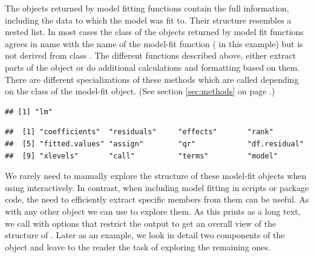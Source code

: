 \documentclass[krantz2]{krantz}\usepackage{knitr}
\begin{document}
\begin{explainbox}\label{box:LM:fit:object}
The objects returned by model fitting functions contain the full information, including the data to which the model was fit to. Their structure resembles a nested list. In most cases the class of the objects returned by model fit functions agrees in name with the name of the model-fit function ( in this example) but is not derived from \Rlang class . The different functions described above, either extract parts of the object or do additional calculations and formatting based on them. There are different specializations of these methods which are called depending on the class of the model-fit object. (See section \ref{sec:methods} on page \pageref{sec:methods}.)

\begin{knitrout}\footnotesize
{}\color{fgcolor}\begin{kframe}
\begin{alltt}
\end{alltt}
\begin{verbatim}
## [1] "lm"
\end{verbatim}
\begin{alltt}
\end{alltt}
\begin{verbatim}
##  [1] "coefficients"  "residuals"     "effects"       "rank"         
##  [5] "fitted.values" "assign"        "qr"            "df.residual"  
##  [9] "xlevels"       "call"          "terms"         "model"
\end{verbatim}
\end{kframe}
\end{knitrout}

We rarely need to manually explore the structure of these model-fit objects when using \Rlang interactively. In contrast, when including model fitting in scripts or package code, the need to efficiently extract specific members from them can be useful. As with any other \Rlang object we can use  to explore them. As this prints as a long text, we call  with options that restrict the output to get an overall view of the structure of . Later as an example, we look in detail two components of the  object and leave to the reader the task of exploring the remaining ones.


\end{explainbox}
\end{document}
